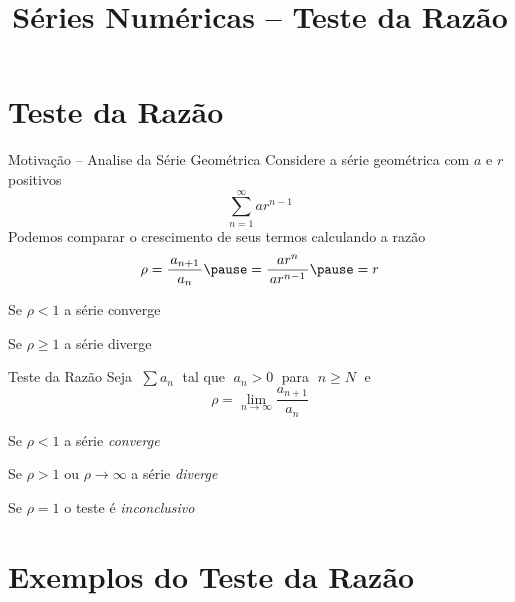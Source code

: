 
\usepackage{integracao_e_series}

\title{Séries Numéricas -- Teste da Razão}



\addtitle

\section{Teste da Razão}

\begin{frame}{Motivação -- Analise da Série Geométrica}
	Considere a série geométrica com $a$ e $r$ positivos
	\[
    \sum_{n=1}^{\infty} ar^{n-1}
  \]
	\pause
	Podemos comparar o crescimento de seus termos calculando a razão
	\[
    \rho
    = \frac{\,a_{n+1}\,}{a_n}
    \pause
    = \frac{ar^n}{\,ar^{n-1}\,}
    \pause
    = r
  \]

	\pause
  Se $\rho<1$     \tabto{17mm} a série converge

  \pause
  Se $\rho\geq 1$ \tabto{17mm} a série diverge
\end{frame}

\begin{frame}{Teste da Razão}
	Seja $\;\sum a_n\;$ tal que $\;a_n>0\;$ para $\;n\geq N\;$ \pause e
	\[
     \rho = \lim_{n\to\infty}\frac{a_{n+1}}{a_n}
  \]

  \pause
	Se $\rho<1$                    \tabto{37mm} a série \emph{converge}

  \pause
	Se $\rho>1$ ou $\rho\to\infty$ \tabto{37mm} a série \emph{diverge}

  \pause
	Se $\rho=1$                    \tabto{37mm} o teste é \emph{inconclusivo}
\end{frame}

\section{Exemplos do Teste da Razão}

